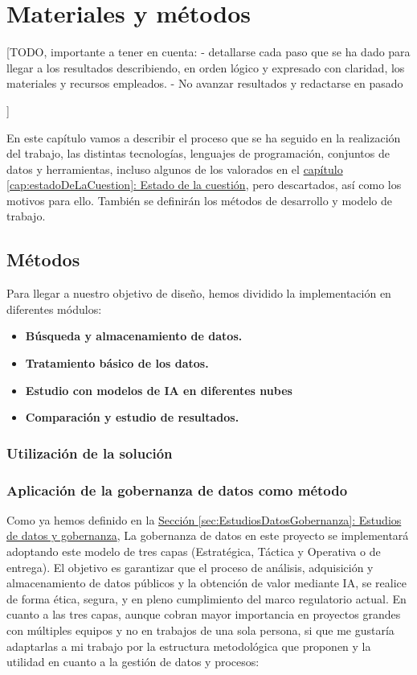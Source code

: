 \chapter{Materiales y métodos}
\label{cap:Materiales y metodos}

[TODO, importante a tener en cuenta:
 -  detallarse cada paso que se ha dado para llegar a los resultados describiendo, en orden lógico y expresado con claridad, los materiales y recursos empleados. 
 - No avanzar resultados y redactarse en pasado

]

En este capítulo vamos a describir el proceso que se ha seguido en la realización del trabajo, las distintas tecnologías, lenguajes de programación, conjuntos de datos y herramientas, incluso algunos de los valorados en el \hyperref[cap:estadoDeLaCuestion]{capítulo \ref*{cap:estadoDeLaCuestion}: Estado de la cuestión}, pero descartados, así como los motivos para ello. También se definirán los métodos de desarrollo y modelo de trabajo. \\


\section{Métodos}

Para llegar a nuestro objetivo de diseño, hemos dividido la implementación en diferentes módulos:

\begin{itemize}
	\item \textbf{ Búsqueda y almacenamiento de datos.}
	\item \textbf{ Tratamiento básico de los datos.}
	\item \textbf{ Estudio con modelos de IA en diferentes nubes}
	\item \textbf{ Comparación y estudio de resultados.}
\end{itemize}

\subsection{Utilización de la solución}


\subsection{Aplicación de la gobernanza de datos como método}  \label{sec:Metodos_Gobernanza}

Como ya hemos definido en la \hyperref[sec:EstudiosDatosGobernanza]{Sección \ref*{sec:EstudiosDatosGobernanza}: Estudios de datos y gobernanza}, La gobernanza de datos en este proyecto se implementará adoptando este modelo de tres capas (Estratégica, Táctica y Operativa o de entrega). El objetivo es garantizar que el proceso de análisis, adquisición y almacenamiento de datos públicos y la obtención de valor mediante IA, se realice de forma ética, segura, y en pleno cumplimiento del marco regulatorio actual. En cuanto a las tres capas, aunque cobran mayor importancia en proyectos grandes con múltiples equipos y no en trabajos de una sola persona, si que me gustaría adaptarlas a mi trabajo por la estructura metodológica que proponen y la utilidad en cuanto a la gestión de datos y procesos:


